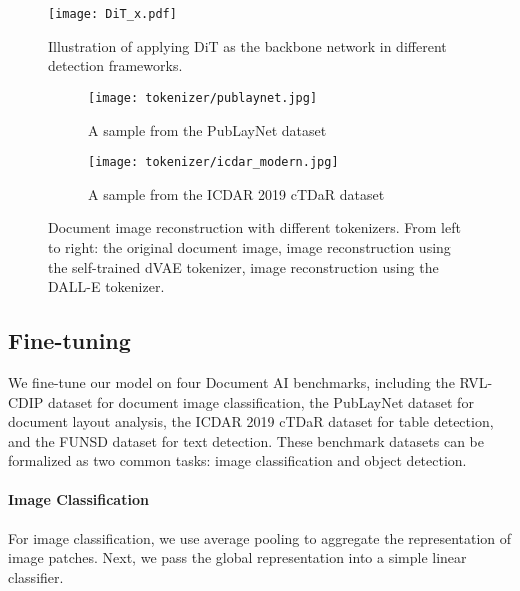 \documentclass[sigconf]{acmart}
\begin{document}
\begin{figure}[t]
    \center
	\texttt{[image: DiT\_x.pdf]}	
    \caption{Illustration of applying DiT as the backbone network in different detection frameworks.}
    \label{det}
\end{figure}

\begin{figure*}[t]
\centering
    \begin{subfigure}[b]{1.0\textwidth}
        \centering
        \texttt{[image: tokenizer/publaynet.jpg]}
        \caption{A sample from the PubLayNet dataset}
        \label{fig:tok1}
    \end{subfigure}
 
    \begin{subfigure}[b]{1.0\textwidth}
        \centering
        \texttt{[image: tokenizer/icdar\_modern.jpg]}
        \caption{A sample from the ICDAR 2019 cTDaR dataset}
        \label{fig:tok2}
    \end{subfigure}
    \caption{Document image reconstruction with different tokenizers. From left to right: the original document image, image reconstruction using the self-trained dVAE tokenizer, image reconstruction using the DALL-E tokenizer.}\label{fig:tok}
\end{figure*}


\subsection{Fine-tuning}
We fine-tune our model on four Document AI benchmarks, including the RVL-CDIP dataset for document image classification, the PubLayNet dataset for document layout analysis, the ICDAR 2019 cTDaR dataset for table detection, and the FUNSD dataset for text detection. These benchmark datasets can be formalized as two common tasks: image classification and object detection.

\paragraph{Image Classification}
For image classification, we use average pooling to aggregate the representation of image patches. Next, we pass the global representation into a simple linear classifier.
 
\end{document}
